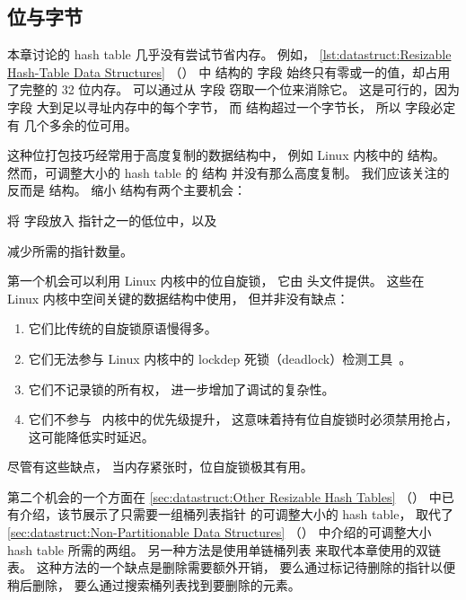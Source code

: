 \subsection{位与字节}
\label{sec:together:Bits and Bytes}

本章讨论的 hash table 几乎没有尝试节省内存。
例如，
\cref{lst:datastruct:Resizable Hash-Table Data Structures}
（）
中  结构的  字段
始终只有零或一的值，却占用了完整的 32 位内存。
可以通过从  字段
窃取一个位来消除它。
这是可行的，因为  字段
大到足以寻址内存中的每个字节，
而  结构超过一个字节长，
所以  字段必定有
几个多余的位可用。

这种位打包技巧经常用于高度复制的数据结构中，
例如 Linux 内核中的  结构。
然而，可调整大小的 hash table 的  结构
并没有那么高度复制。
我们应该关注的反而是  结构。
缩小  结构有两个主要机会：
\begin{enumerate*}[(1)]
\item 将  字段放入
 指针之一的低位中，以及
\item 减少所需的指针数量。
\end{enumerate*}

第一个机会可以利用 Linux 内核中的位自旋锁，
它由 
头文件提供。
这些在 Linux 内核中空间关键的数据结构中使用，
但并非没有缺点：

\begin{enumerate}
\item	它们比传统的自旋锁原语慢得多。
\item	它们无法参与 Linux 内核中的
	lockdep 死锁（deadlock）检测工具~\cite{JonathanCorbet2006lockdep}。
\item	它们不记录锁的所有权，
	进一步增加了调试的复杂性。
\item	它们不参与 \rt\ 内核中的优先级提升，
	这意味着持有位自旋锁时必须禁用抢占，
	这可能降低实时延迟。
\end{enumerate}

尽管有这些缺点，
当内存紧张时，位自旋锁极其有用。

第二个机会的一个方面在
\cref{sec:datastruct:Other Resizable Hash Tables}
（）
中已有介绍，该节展示了只需要一组桶列表指针
的可调整大小的 hash table，
取代了
\cref{sec:datastruct:Non-Partitionable Data Structures}
（）
中介绍的可调整大小 hash table 所需的两组。
另一种方法是使用单链桶列表
来取代本章使用的双链表。
这种方法的一个缺点是删除需要额外开销，
要么通过标记待删除的指针以便稍后删除，
要么通过搜索桶列表找到要删除的元素。

